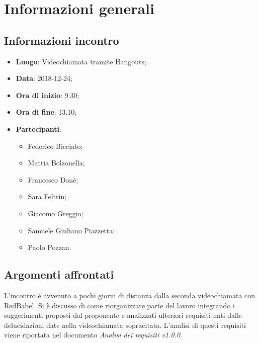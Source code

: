 \section{Informazioni generali}

\subsection{Informazioni incontro}
\begin{itemize}
\item \textbf{Luogo}: Videochiamata tramite Hangouts;
\item \textbf{Data}: 2018-12-24;
\item \textbf{Ora di inizio}: 9.30;
\item \textbf{Ora di fine}: 13.10;
\item \textbf{Partecipanti}:
\begin{itemize}
	\item Federico Bicciato;
	\item Mattia Bolzonella;
	\item Francesco Donè;
	\item Sara Feltrin;
	\item Giacomo Greggio;
	\item Samuele Giuliano Piazzetta;
	\item Paolo Pozzan.
\end{itemize}
\end{itemize}

\subsection{Argomenti affrontati}
L'incontro è avvenuto a pochi giorni di distanza dalla seconda videochiamata
con RedBabel. Si è discusso di come riorganizzare parte del lavoro integrando 
i suggerimenti proposti dal proponente e analizzati ulteriori requisiti nati dalle
delucidazioni date nella videochiamata sopracitata. L'analisi di questi requisiti 
viene riportata nel documento \textit{Analisi dei requisiti v1.0.0}.
